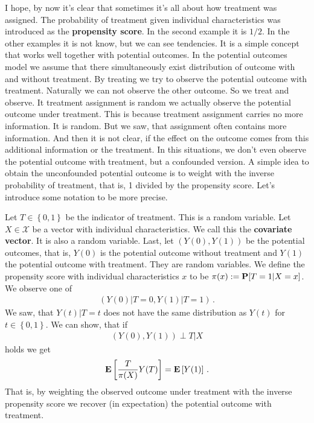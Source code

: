 I hope, by now it's clear that sometimes it's all about how treatment was assigned.
The probability of treatment given individual characteristics 
was introduced as the \textbf{propensity score}\cite{Rosenbaum1983}.
In the second example it is $1/2$. In the other examples it is not know, but we can see tendencies. 
It is a simple concept that works well together with potential outcomes.
In the potential outcomes model we assume that there simultaneously exist distribution of outcome with and without treatment.
By treating we try to observe the potential outcome with treatment.
Naturally we can not observe the other outcome.
So we treat and observe. It treatment assignment is random we actually observe the potential outcome under treatment.
This is because treatment assignment carries no more information. It is random.
But we saw, that assignment often contains more information.
And then it is not clear, if the effect on the outcome comes from this additional information or the treatment.
In this situations, we don't even observe the potential outcome with treatment, but a confounded version.
A simple idea to obtain the unconfounded potential outcome is to weight with the inverse probability of treatment, that is, 1 divided by the propensity score.
Let's introduce some notation to be more precise.

Let $T\in \left\{ 0,1 \right\}$ be the indicator of treatment. This is a random variable.
Let $X\in\mathcal{X}$ be a vector with individual characteristics. We call this the \textbf{covariate vector}. It is also a random variable.
Last, let $(Y(0),Y(1))$ be the potential outcomes, that is, $Y(0)$ is the potential outcome without treatment and $Y(1)$ the potential outcome with treatment. They are random variables.
We define the propensity score with individual characteristics $x$ to be
$\pi(x):=\P[T=1|X=x]$. We observe one of 
\begin{gather}
  (Y(0)|T=0,Y(1)|T=1)
  \,.
\end{gather}
We saw, that 
$Y(t)|T=t$ does not have the same distribution as $Y(t)$ for $t\in \left\{ 0,1 \right\}$.
We can show, that if 
\begin{gather}
  (Y(0),Y(1))\perp T |X
\end{gather}
holds we get 
\begin{gather}
  \E
  \left[ 
    \frac{T}{\pi(X)}Y(T)
  \right]
  =
  \E
  \left[ Y(1) \right]
  \,.
\end{gather}
That is, by weighting the observed outcome under treatment with the inverse propensity score we recover (in expectation) the potential outcome with treatment. 

